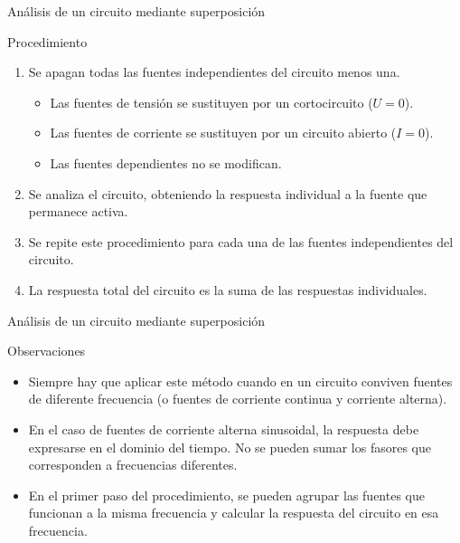\documentclass[xcolor={usenames,svgnames,dvipsnames}]{beamer}
\begin{document}
\begin{frame}[label={sec:orgd205df9}]{Análisis de un circuito mediante superposición}
\begin{block}{Procedimiento}
\begin{enumerate}
\item Se apagan todas las fuentes \alert{independientes} del circuito menos una.
\begin{itemize}
\item Las fuentes de tensión se sustituyen por un cortocircuito (\(U = 0\)).
\item Las fuentes de corriente se sustituyen por un circuito abierto (\(I = 0\)).
\item Las fuentes \alert{dependientes} \alert{no} se modifican.
\end{itemize}
\item Se analiza el circuito, obteniendo la respuesta individual a la fuente que permanece activa.
\item Se repite este procedimiento para cada una de las fuentes \alert{independientes} del circuito.
\item La respuesta total del circuito es la suma de las respuestas individuales.
\end{enumerate}
\end{block}
\end{frame}

\begin{frame}[label={sec:org353cba2}]{Análisis de un circuito mediante superposición}
\begin{block}{Observaciones}
\begin{itemize}
\item \alert{Siempre} hay que aplicar este método cuando en un circuito conviven fuentes de \alert{diferente frecuencia} (o fuentes de corriente continua y corriente alterna).
\item En el caso de fuentes de corriente alterna \alert{sinusoidal}, la respuesta debe expresarse en el \alert{dominio del tiempo}. \alert{No} se pueden \alert{sumar} los \alert{fasores} que corresponden a \alert{frecuencias diferentes}.
\item En el primer paso del procedimiento, se pueden agrupar las fuentes que funcionan a la misma frecuencia y calcular la respuesta del circuito en esa frecuencia.
\end{itemize}
\end{block}
\end{frame}
\end{document}
